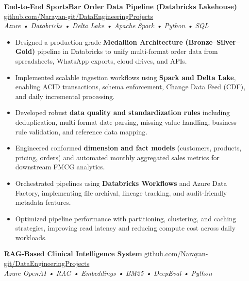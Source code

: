 \documentclass[a4paper,8pt]{article}
\begin{document}
\noindent
\textbf{End-to-End SportsBar Order Data Pipeline (Databricks Lakehouse)} 
\hfill 
\textcolor[HTML]{371e77}{\href{https://github.com/Narayan-git/DataEngineeringProjects/tree/main/DataEngineeringProject_EndToEndSportsBarOrderDataPipeline}{github.com/Narayan-git/DataEngineeringProjects}} \\
\textit{\textcolor[HTML]{371e77}{Azure • Databricks • Delta Lake • Apache Spark • Python • SQL}}\\[-1.7em]

\begin{itemize}[leftmargin=1.2em, itemsep=1pt, topsep=0pt, parsep=0pt, partopsep=0pt]
    \item Designed a production-grade \textbf{Medallion Architecture (Bronze–Silver–Gold)} pipeline in Databricks to unify multi-format order data from spreadsheets, WhatsApp exports, cloud drives, and APIs.
    \item Implemented scalable ingestion workflows using \textbf{Spark and Delta Lake}, enabling ACID transactions, schema enforcement, Change Data Feed (CDF), and daily incremental processing.
    \item Developed robust \textbf{data quality and standardization rules} including deduplication, multi-format date parsing, missing value handling, business rule validation, and reference data mapping.
    \item Engineered conformed \textbf{dimension and fact models} (customers, products, pricing, orders) and automated monthly aggregated sales metrics for downstream FMCG analytics.
    \item Orchestrated pipelines using \textbf{Databricks Workflows} and Azure Data Factory, implementing file archival, lineage tracking, and audit-friendly metadata features.
    \item Optimized pipeline performance with partitioning, clustering, and caching strategies, improving read latency and reducing compute cost across daily workloads.
\end{itemize}
\vspace{-0.7em}

\noindent
\textbf{RAG-Based Clinical Intelligence System} 
\hfill 
\textcolor[HTML]{371e77}{\href{https://github.com/Narayan-git/DataEngineeringProjects/tree/main/RAG_Based_ClinicalIntelligenceSystem}{github.com/Narayan-git/DataEngineeringProjects}} \\
\textit{\textcolor[HTML]{371e77}{Azure OpenAI • RAG • Embeddings • BM25 • DeepEval • Python}}\\[-1.7em]
\end{document}
